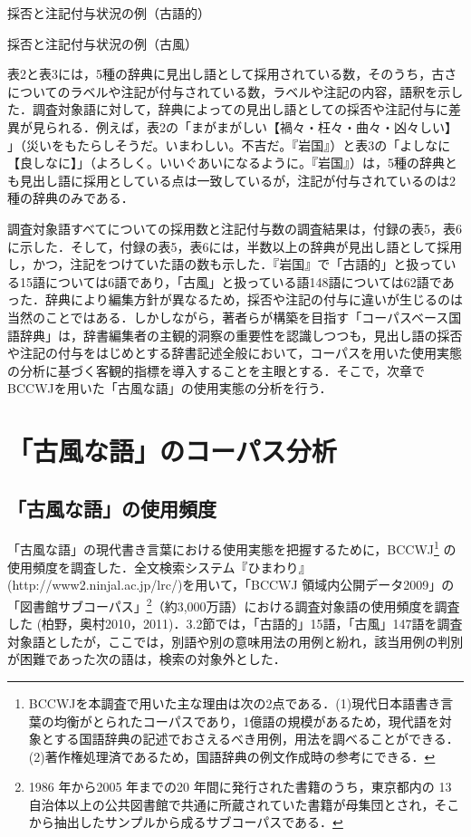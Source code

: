 \documentclass[japanese]{jnlp_1.4}
\begin{document}
\begin{table}[t]
\caption{採否と注記付与状況の例（古語的）}

\end{table}

\begin{table}[p]
\caption{採否と注記付与状況の例（古風）}

\end{table}

表2と表3には，5種の辞典に見出し語として採用されている数，そのうち，古さについてのラベルや注記が付与されている数，ラベルや注記の内容，語釈を示した．調査対象語に対して，辞典によっての見出し語としての採否や注記付与に差異が見られる．例えば，表2の「まがまがしい【禍々・枉々・曲々・凶々しい】 
」（災いをもたらしそうだ。いまわしい。不吉だ。『岩国』）と表3の「よしなに【良しなに】」（よろしく。いいぐあいになるように。『岩国』）は，5種の辞典とも見出し語に採用としている点は一致しているが，注記が付与されているのは2種の辞典のみである．

調査対象語すべてについての採用数と注記付与数の調査結果は，付録の表5，表6に示した．そして，付録の表5，表6には，半数以上の辞典が見出し語として採用し，かつ，注記をつけていた語の数も示した．『岩国』で「古語的」と扱っている15語については6語であり，「古風」と扱っている語148語については62語であった．辞典により編集方針が異なるため，採否や注記の付与に違いが生じるのは当然のことではある．しかしながら，著者らが構築を目指す「コーパスベース国語辞典」は，辞書編集者の主観的洞察の重要性を認識しつつも，見出し語の採否や注記の付与をはじめとする辞書記述全般において，コーパスを用いた使用実態の分析に基づく客観的指標を導入することを主眼とする．そこで，次章でBCCWJを用いた「古風な語」の使用実態の分析を行う．


\section{「古風な語」のコーパス分析}

\subsection{「古風な語」の使用頻度}

「古風な語」の現代書き言葉における使用実態を把握するために，BCCWJ\footnote{BCCWJを本調査で用いた主な理由は次の2点である．(1)現代日本語書き言葉の均衡がとられたコーパスであり，1億語の規模があるため，現代語を対象とする国語辞典の記述でおさえるべき用例，用法を調べることができる．(2)著作権処理済であるため，国語辞典の例文作成時の参考にできる．} の使用頻度を調査した．全文検索システム『ひまわり』(http://www2.ninjal.ac.jp/lrc/)を用いて，「BCCWJ 領域内公開データ2009」の「図書館サブコーパス」\footnote{1986 年から2005 年までの20 年間に発行された書籍のうち，東京都内の 13 自治体以上の公共図書館で共通に所蔵されていた書籍が母集団とされ，そこから抽出したサンプルから成るサブコーパスである．}（約3,000万語）における調査対象語の使用頻度を調査した (柏野，奥村2010，2011)．3.2節では，「古語的」15語，「古風」147語を調査対象語としたが，ここでは，別語や別の意味用法の用例と紛れ，該当用例の判別が困難であった次の語は，検索の対象外とした．
\end{document}
